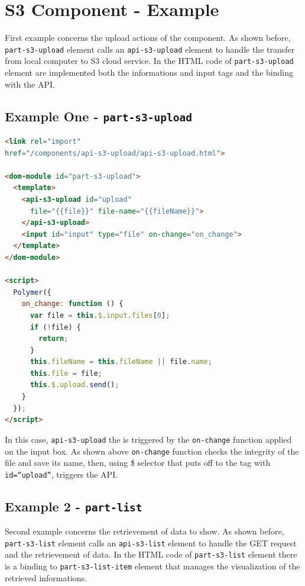 \section{S3 Component - Example}
\label{sec:S3_exmpl}

First example concerns the upload actions of the component.
As shown before, \texttt{part-s3-upload} element calls an \texttt{api-s3-upload} element to handle the transfer from local computer to S3 cloud service.
In the HTML code of \texttt{part-s3-upload} element are implemented both the informations and input tags and the binding with the API.

\subsection{Example One - \texttt{part-s3-upload}}

\begin{lstlisting}[language=html]
<link rel="import"
href="/components/api-s3-upload/api-s3-upload.html">

<dom-module id="part-s3-upload">
  <template>
    <api-s3-upload id="upload"
      file="{{file}}" file-name="{{fileName}}">
    </api-s3-upload>
    <input id="input" type="file" on-change="on_change">
  </template>
</dom-module>

<script>
  Polymer({
    on_change: function () {
      var file = this.$.input.files[0];
      if (!file) {
        return;
      }
      this.fileName = this.fileName || file.name;
      this.file = file;
      this.$.upload.send();
    }
  });
</script>

\end{lstlisting}

In this case, \texttt{api-s3-upload} the is triggered by the \texttt{on-change} function applied on the input box. As shown above \texttt{on-change} function checks the integrity of the file and save its name, then, using \$ selector that puts off to the tag with \texttt{id=``upload''}, triggers the API.

\subsection{Example 2 - \texttt{part-list}}

Second example concerns the retrievement of data to show.
As shown before, \texttt{part-s3-list} element calls an \texttt{api-s3-list} element to handle the GET request and the retrievement of data.
In the HTML code of \texttt{part-s3-list} element there is a binding to \texttt{part-s3-list-item} element that manages the visualization of the retrieved informations.


